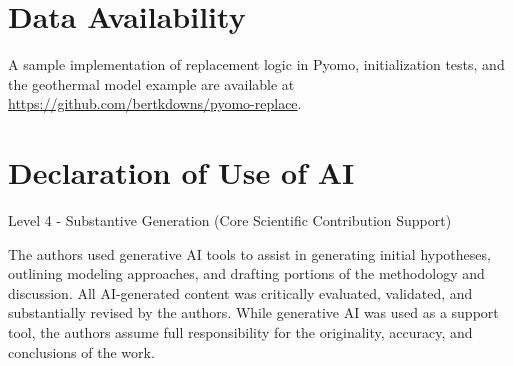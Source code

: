 \documentclass[10pt,letterpaper]{article}
\begin{document}
\section*{Data Availability}
A sample implementation of replacement logic in Pyomo, initialization tests, and the geothermal model example are available at \url{https://github.com/bertkdowns/pyomo-replace}.

\section*{Declaration of Use of AI}
Level 4 - Substantive Generation (Core Scientific Contribution Support)

The authors used generative AI tools to assist in generating initial hypotheses, outlining modeling approaches, and drafting portions of the methodology and discussion. All AI-generated content was critically evaluated, validated, and substantially revised by the authors. While generative AI was used as a support tool, the authors assume full responsibility for the originality, accuracy, and conclusions of the work.

\pseprintreferences
\pseprintcopyright
\end{document}
